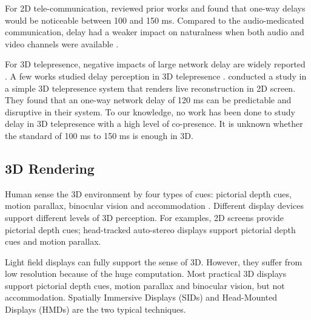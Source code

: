 For 2D tele-communication, \cite{tam2012video, polycom2006traffic} reviewed prior works and found that one-way delays would be noticeable between 100 and 150 ms. Compared to the audio-medicated communication, delay had a weaker impact on naturalness when both audio and video channels were available \cite{tam2012video}.

For 3D telepresence, negative impacts of large network delay are widely reported \cite{beck2013immersive, gibbs1999teleport, maimone2011encumbrance, kurillo2008immersive, raghuraman2015distortion}. A few works studied delay perception in 3D telepresence \cite{wu2010m, huang2012towards, wu2009quality}. \cite{wu2009quality} conducted a study in a simple 3D telepresence system that renders live reconstruction in 2D screen. They found that an one-way network delay of 120 ms can be predictable and disruptive in their system. To our knowledge, no work has been done to study delay in 3D telepresence with a high level of co-presence. It is unknown whether the standard of 100 ms to 150 ms is enough in 3D.

\subsection{3D Rendering}

Human sense the 3D environment by four types of cues: pictorial depth cues, motion parallax, binocular vision and accommodation \cite{kooi2004visual}. Different display devices support different levels of 3D perception. For examples, 2D screens provide pictorial depth cues; head-tracked auto-stereo displays \cite{maimone2011encumbrance, maimone2012real, pejsa2016room2room} support pictorial depth cues and motion parallax.

Light field displays \cite{jones2007rendering, jurik2011prototyping, kim2012telehuman, gotsch2018telehuman2} can fully support the sense of 3D. However, they suffer from low resolution because of the huge computation. Most practical 3D displays support pictorial depth cues, motion parallax and binocular vision, but not accommodation. Spatially Immersive Displays (SIDs) and Head-Mounted Displays (HMDs) are the two typical techniques.



